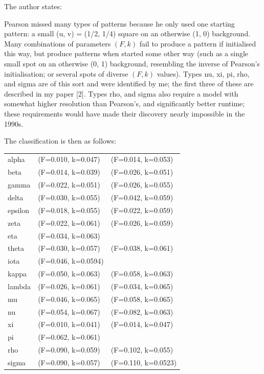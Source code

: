 The author states:
\begin{displayquote}
{\color{darkgray}
Pearson missed many types of patterns because he only used one starting pattern: 
a small (u, v) = (1/2, 1/4) square on an otherwise (1, 0) background. Many combinations of parameters 
$(F,k)$ fail to produce 
a pattern if initialised this way, but produce patterns when started some other way (such as a single small spot on 
an otherwise (0, 1) background, resembling the inverse of Pearson's initialisation; or several spots of
diverse $(F,k)$ values). Types nu, xi, pi, rho, and sigma are of this sort and were identified by me; 
the first three of these are described in my paper [2]. 
Types rho, and sigma also require a model with somewhat higher 
resolution than Pearson's, and significantly better runtime; these requirements would have made their discovery 
nearly impossible in the 1990s.
}
\end{displayquote} 

The classification is then as follows:
\begin{center}
\begin{tabular}{lll}
alpha   & (F=0.010, k=0.047) &(F=0.014, k=0.053) \\
beta    & (F=0.014, k=0.039) &(F=0.026, k=0.051) \\
gamma   & (F=0.022, k=0.051) &(F=0.026, k=0.055) \\
delta   & (F=0.030, k=0.055) &(F=0.042, k=0.059) \\
epsilon & (F=0.018, k=0.055) &(F=0.022, k=0.059) \\
zeta    & (F=0.022, k=0.061) &(F=0.026, k=0.059) \\
eta     & (F=0.034, k=0.063) &	\\
theta   & (F=0.030, k=0.057) &(F=0.038, k=0.061) \\
iota    & (F=0.046, k=0.0594)   \\
kappa   & (F=0.050, k=0.063) &(F=0.058, k=0.063) \\
lambda  & (F=0.026, k=0.061) &(F=0.034, k=0.065) \\
mu      & (F=0.046, k=0.065) &(F=0.058, k=0.065) \\
nu      & (F=0.054, k=0.067) &(F=0.082, k=0.063) \\
xi      & (F=0.010, k=0.041) &(F=0.014, k=0.047) \\
pi      & (F=0.062, k=0.061) \\
rho     & (F=0.090, k=0.059) &(F=0.102, k=0.055) \\
sigma   & (F=0.090, k=0.057) &(F=0.110, k=0.0523)
\end{tabular}
\end{center}

